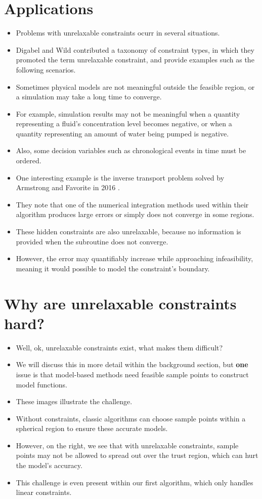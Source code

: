 \documentclass{article}
\begin{document}
	\section{Applications}
\begin{itemize}
\item Problems with unrelaxable constraints ocurr in several situations.
\item Digabel and Wild contributed a taxonomy of constraint types, in which they promoted the term unrelaxable constraint, and provide examples such as the following scenarios.
\item Sometimes physical models are not meaningful outside the feasible region, or a simulation may take a long time to converge.
\item For example, simulation results may not be meaningful when a quantity representing a fluid's concentration level becomes negative, or when a quantity representing an amount of water being pumped is negative.
\item Also, some decision variables such as chronological events in time must be ordered.
\item One interesting example is the inverse transport problem solved by Armstrong and Favorite in 2016 \cite{inverseproblem}.
\item They note that one of the numerical integration methods used within their algorithm produces large errors or simply does not converge in some regions.
\item These hidden constraints are also unrelaxable, because no information is provided when the subroutine does not converge.
\item However, the error may quantifiably increase while approaching infeasibility, meaning it would possible to model the constraint's boundary.
\end{itemize}


	\section{Why are unrelaxable constraints hard?}
\begin{itemize}
\item Well, ok, unrelaxable constraints exist, what makes them difficult?
\item We will discuss this in more detail within the background section, but \textbf{one} issue is that model-based methods need feasible sample points to construct model functions.
\item These images illustrate the challenge.
\item Without constraints, classic algorithms can choose sample points within a spherical region to ensure these accurate models.
\item However, on the right, we see that with unrelaxable constraints, sample points may not be allowed to spread out over the trust region, which can hurt the model's accuracy.
\item This challenge is even present within our first algorithm, which only handles linear constraints.
\end{itemize}
\end{document}
